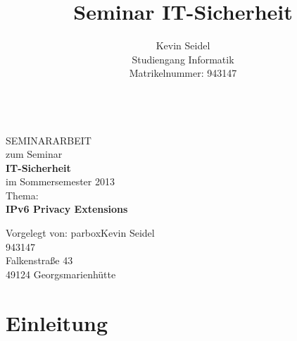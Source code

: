 \documentclass[a4paper, 12pt]{scrartcl}
\title{Seminar IT-Sicherheit}
\author{Kevin Seidel \\ Studiengang Informatik \\ Matrikelnummer: 943147}
\begin{document}
\begin{titlepage}
\begin{center}
\vspace*{1.5cm}
\begin{Large}
\end{Large}

\noindent\hrulefill
\\[1.5cm]
SEMINARARBEIT \\[1cm]
zum Seminar \\[1cm]
\textbf{IT-Sicherheit} \\[1cm]
im Sommersemester 2013 \\[1.5cm]
Thema: \\[1cm]
\textbf{IPv6 Privacy Extensions} \\[2cm]
\end{center}

\begin{flushleft}
Vorgelegt von: \hfill 
parbox{Kevin Seidel \\ 943147 \\ Falkenstraße 43 \\ 49124 Georgsmarienhütte}
\end{flushleft}
\end{titlepage}

\newpage

\tableofconetents

\newpage
{}
\setcounter{page}{1}

\section{Einleitung}
\end{document}

